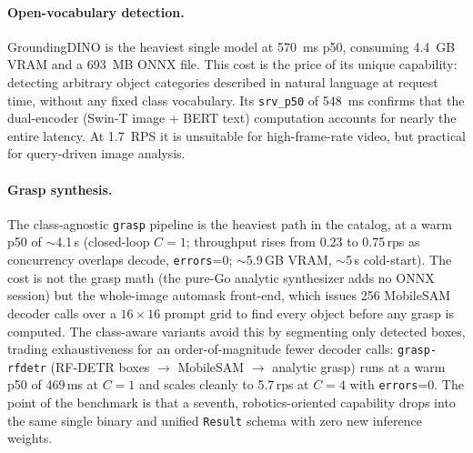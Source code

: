 \paragraph{Open-vocabulary detection.}
GroundingDINO \cite{liu2023groundingdino} is the heaviest single model at 570~ms p50,
consuming 4.4~GB VRAM and a 693~MB ONNX file.  This cost is the price of its unique
capability: detecting arbitrary object categories described in natural language at
request time, without any fixed class vocabulary.  Its \texttt{srv\_p50} of 548~ms
confirms that the dual-encoder (Swin-T image + BERT text) computation accounts for
nearly the entire latency.  At 1.7~RPS it is unsuitable for high-frame-rate video,
but practical for query-driven image analysis.

\paragraph{Grasp synthesis.}
The class-agnostic \texttt{grasp} pipeline is the heaviest path in the catalog, at a warm p50 of
$\sim$4.1\,s (closed-loop $C{=}1$; throughput rises from 0.23 to 0.75\,rps as concurrency
overlaps decode, \texttt{errors}=0; $\sim$5.9\,GB VRAM, $\sim$5\,s cold-start).  The cost is
not the grasp math (the pure-Go analytic synthesizer adds no ONNX session) but the
whole-image automask front-end, which issues 256 MobileSAM decoder calls over a $16{\times}16$
prompt grid to find every object before any grasp is computed.  The class-aware variants avoid this by segmenting only detected boxes, trading
exhaustiveness for an order-of-magnitude fewer decoder calls: \texttt{grasp-rfdetr} (RF-DETR boxes
$\to$ MobileSAM $\to$ analytic grasp) runs at a warm p50 of 469\,ms at $C{=}1$ and scales cleanly
to 5.7\,rps at $C{=}4$ with \texttt{errors}=0.  The point of the benchmark is that a seventh,
robotics-oriented capability drops into the same single binary and unified \texttt{Result} schema
with zero new inference weights.

